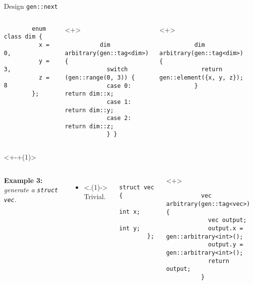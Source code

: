 \begin{frame}[fragile,t]{\halcheck{} \textemdash{} Design \textemdash{} \texttt{gen::next}}
\begin{onlyenv}
\begin{columns}[T]
      \begin{verbatim}
        enum class dim {
          x = 0,
          y = 3,
          z = 8
        };
      \end{verbatim}

      \begin{onlyenv}<+>
        \begin{verbatim}
          dim arbitrary(gen::tag<dim>) {
            switch (gen::range(0, 3)) {
            case 0: return dim::x;
            case 1: return dim::y;
            case 2: return dim::z;
            } }
        \end{verbatim}
      \end{onlyenv}

      \begin{onlyenv}<+>
        \begin{verbatim}
          dim arbitrary(gen::tag<dim>) {
            return gen::element({x, y, z});
          }
        \end{verbatim}
      \end{onlyenv}
    \end{columns}
  \end{onlyenv}

  \begin{onlyenv}<+-+(1)>
    \begin{columns}[T]
      \textbf{Example 3:} \emph{generate a \texttt{struct vec}}.

      \begin{itemize}
        \item<.(1)-> Trivial.
      \end{itemize}

      \begin{verbatim}
        struct vec {
          int x;
          int y;
        };
      \end{verbatim}

      \begin{onlyenv}<+>
        \begin{verbatim}
          vec arbitrary(gen::tag<vec>) {
            vec output;
            output.x = gen::arbitrary<int>();
            output.y = gen::arbitrary<int>();
            return output;
          }
        \end{verbatim}
      \end{onlyenv}
    \end{columns}
  \end{onlyenv}


\end{frame}
